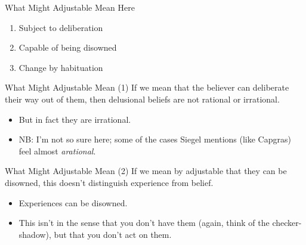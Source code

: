 \documentclass[
  17pt,
  letterpaper,
  ignorenonframetext,
  aspectratio=169,
  handout,
  xcolor={dvipsnames}]{beamer}
\providecommand{\tightlist}{%
  \setlength{\itemsep}{0pt}\setlength{\parskip}{0pt}}\usepackage{longtable,booktabs,array}
\begin{document}
\begin{frame}{What Might Adjustable Mean Here}
\protect\hypertarget{what-might-adjustable-mean-here}{}
\begin{enumerate}[<+->]
\tightlist
\item
  Subject to deliberation
\item
  Capable of being disowned
\item
  Change by habituation
\end{enumerate}
\end{frame}

\begin{frame}{What Might Adjustable Mean (1)}
\protect\hypertarget{what-might-adjustable-mean-1}{}
If we mean that the believer can deliberate their way out of them, then
delusional beliefs are not rational or irrational.

\begin{itemize}[<+->]
\tightlist
\item
  But in fact they are irrational.
\item
  NB: I'm not so sure here; some of the cases Siegel mentions (like
  Capgras) feel almost \emph{arational}.
\end{itemize}
\end{frame}

\begin{frame}{What Might Adjustable Mean (2)}
\protect\hypertarget{what-might-adjustable-mean-2}{}
If we mean by adjustable that they can be disowned, this doesn't
distinguish experience from belief.

\begin{itemize}[<+->]
\tightlist
\item
  Experiences can be disowned.
\item
  This isn't in the sense that you don't have them (again, think of the
  checker-shadow), but that you don't act on them.
\end{itemize}
\end{frame}
\end{document}
